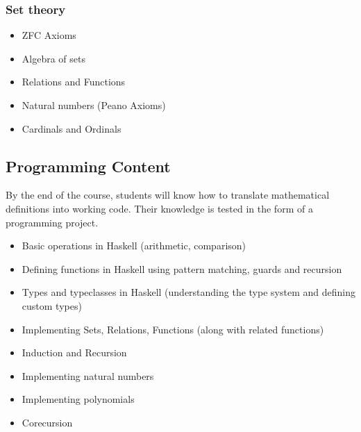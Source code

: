 \documentclass{article}[12pt]
\begin{document}
\subsubsection{Set theory}
\begin{itemize}
    \item ZFC Axioms
    \item Algebra of sets
    \item Relations and Functions
    \item Natural numbers (Peano Axioms)
    \item Cardinals and Ordinals
\end{itemize}

\subsection{Programming Content}

By the end of the course, students will know how to translate mathematical definitions into working code. Their knowledge is tested in the form of a programming project.
\begin{itemize}
    \item Basic operations in Haskell (arithmetic, comparison)
    \item Defining functions in Haskell using pattern matching, guards and recursion
    \item Types and typeclasses in Haskell (understanding the type system and defining custom types)
    \item Implementing Sets, Relations, Functions (along with related functions)
    \item Induction and Recursion
    \item Implementing natural numbers
    \item Implementing polynomials
    \item Corecursion 
\end{itemize}
\end{document}
